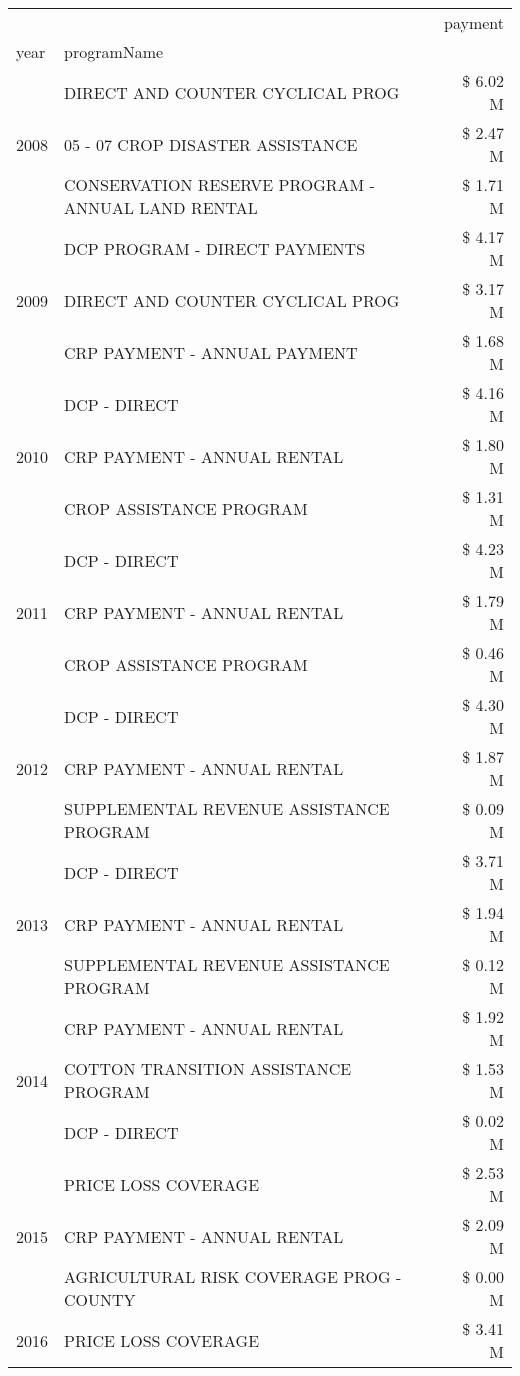 \begin{tabular}{llr}
\toprule
 &  & payment \\
year & programName &  \\
\midrule
\multirow[t]{3}{*}{2008} & DIRECT AND COUNTER CYCLICAL PROG & \$ 6.02 M \\
 & 05 - 07 CROP DISASTER ASSISTANCE & \$ 2.47 M \\
 & CONSERVATION RESERVE PROGRAM - ANNUAL LAND RENTAL & \$ 1.71 M \\
\cline{1-3}
\multirow[t]{3}{*}{2009} & DCP PROGRAM - DIRECT PAYMENTS & \$ 4.17 M \\
 & DIRECT AND COUNTER CYCLICAL PROG & \$ 3.17 M \\
 & CRP PAYMENT - ANNUAL PAYMENT & \$ 1.68 M \\
\cline{1-3}
\multirow[t]{3}{*}{2010} & DCP - DIRECT & \$ 4.16 M \\
 & CRP PAYMENT - ANNUAL RENTAL & \$ 1.80 M \\
 & CROP ASSISTANCE PROGRAM & \$ 1.31 M \\
\cline{1-3}
\multirow[t]{3}{*}{2011} & DCP - DIRECT & \$ 4.23 M \\
 & CRP PAYMENT - ANNUAL RENTAL & \$ 1.79 M \\
 & CROP ASSISTANCE PROGRAM & \$ 0.46 M \\
\cline{1-3}
\multirow[t]{3}{*}{2012} & DCP - DIRECT & \$ 4.30 M \\
 & CRP PAYMENT - ANNUAL RENTAL & \$ 1.87 M \\
 & SUPPLEMENTAL REVENUE ASSISTANCE PROGRAM & \$ 0.09 M \\
\cline{1-3}
\multirow[t]{3}{*}{2013} & DCP - DIRECT & \$ 3.71 M \\
 & CRP PAYMENT - ANNUAL RENTAL & \$ 1.94 M \\
 & SUPPLEMENTAL REVENUE ASSISTANCE PROGRAM & \$ 0.12 M \\
\cline{1-3}
\multirow[t]{3}{*}{2014} & CRP PAYMENT - ANNUAL RENTAL & \$ 1.92 M \\
 & COTTON TRANSITION ASSISTANCE PROGRAM & \$ 1.53 M \\
 & DCP - DIRECT & \$ 0.02 M \\
\cline{1-3}
\multirow[t]{3}{*}{2015} & PRICE LOSS COVERAGE & \$ 2.53 M \\
 & CRP PAYMENT - ANNUAL RENTAL & \$ 2.09 M \\
 & AGRICULTURAL RISK COVERAGE PROG - COUNTY & \$ 0.00 M \\
\cline{1-3}
\multirow[t]{3}{*}{2016} & PRICE LOSS COVERAGE & \$ 3.41 M \\

\end{tabular}
